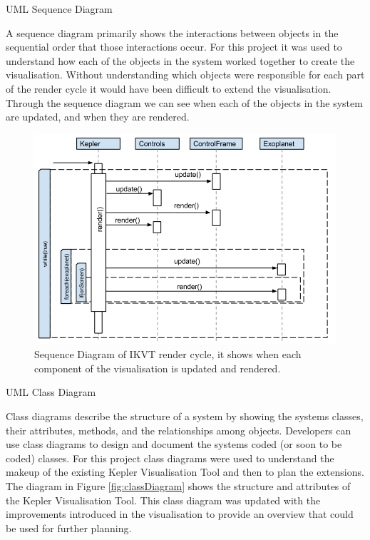 \begin{enumerate}
\clearpage
{\bf \item UML Sequence Diagram}
  A sequence diagram primarily shows the interactions between
objects in the sequential order that those interactions occur.
For this project it was used to understand how each of the objects in the system
worked together to create the visualisation. Without understanding which objects
were responsible for each part of the render cycle it would have been difficult
to extend the visualisation. Through the sequence diagram we can see when each
of the objects in the system are updated, and when they are rendered. 
   \begin{figure}[H]
  \centering
      \includegraphics[width=1\textwidth]{images/sequence.png}
  \caption[Sequence Diagram of IKVT render cycle]{Sequence Diagram of IKVT
render cycle, it shows when each component of the visualisation is updated and
rendered.}  
    \label{fig:sequenceDiagram}
\end{figure}
\clearpage
 {\bf \item UML Class Diagram}
 Class diagrams describe the structure of a system by showing the systems
classes, their attributes, methods, and the relationships among objects.
 Developers can use class diagrams to design and document the systems coded (or
soon to be coded) classes. For this project class diagrams were used to
understand
the makeup of the existing Kepler Visualisation Tool and then to plan the
extensions. The diagram in Figure \ref{fig:classDiagram} shows the structure and attributes of the Kepler Visualisation Tool. This class
diagram was updated with the improvements introduced in the visualisation
to provide an overview that could be used for further planning.

\end{enumerate}
